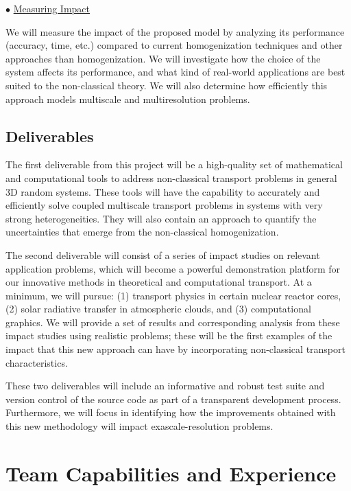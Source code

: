 \documentclass[12pt]{article}
\begin{document}
$\bullet$ \underline{Measuring Impact}

We will measure the impact of the proposed model by analyzing its performance (accuracy, time, etc.) compared to current homogenization techniques and other approaches than homogenization.
We will investigate how the choice of the system affects its performance, and what kind of real-world applications are best suited to the non-classical theory.
We will also determine how efficiently this approach models multiscale and multiresolution problems.


\subsection{Deliverables}

The first deliverable from this project will be a high-quality set of mathematical and computational tools to address non-classical transport problems in general 3D random systems.
These tools will have the capability to accurately and efficiently solve coupled multiscale transport problems in systems with very strong heterogeneities.
They will also contain an approach to quantify the uncertainties that emerge from the non-classical homogenization.

The second deliverable will consist of a series of impact studies on relevant application problems, which will become a powerful demonstration platform for our innovative methods in theoretical and computational transport.
At a minimum, we will pursue:
(1) transport physics in certain nuclear reactor cores,
(2) solar radiative transfer in atmospheric clouds, and
(3) computational graphics.
We will provide a set of results and corresponding analysis from these impact studies using realistic problems;
these will be the first examples of the impact that this new approach can have by incorporating non-classical transport characteristics.

These two deliverables will include an informative and robust test suite and version control of the source code as part of a transparent development process.
Furthermore, we will focus in identifying how the improvements obtained with this new methodology will impact exascale-resolution problems.


\section{Team Capabilities and Experience}
\end{document}
